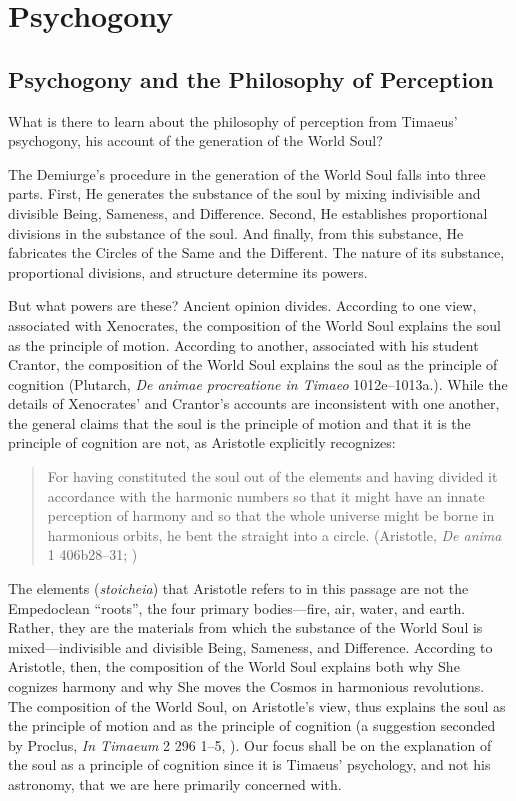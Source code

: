 
\chapter{Psychogony} %
\label{cha:psychogony}

\section{Psychogony and the Philosophy of Perception} %
\label{sec:psychogony_and_the_philosophy_of_perception}

What is there to learn about the philosophy of perception from Timaeus' psychogony, his account of the generation of the World Soul? 

The Demiurge's procedure in the generation of the World Soul falls into three parts. First, He generates the substance of the soul by mixing indivisible and divisible Being, Sameness, and Difference. Second, He establishes proportional divisions in the substance of the soul. And finally, from this substance, He fabricates the Circles of the Same and the Different. The nature of its substance, proportional divisions, and structure determine its powers. 

But what powers are these? Ancient opinion divides. According to one view, associated with Xenocrates, the composition of the World Soul explains the soul as the principle of motion. According to another, associated with his student Crantor, the composition of the World Soul explains the soul as the principle of cognition (Plutarch, \emph{De animae procreatione in Timaeo} 1012e--1013a.). While the details of Xenocrates' and Crantor's accounts are inconsistent with one another, the general claims that the soul is the principle of motion and that it is the principle of cognition are not, as Aristotle explicitly recognizes:
\begin{quote}
	For having constituted the soul out of the elements and having divided it accordance with the harmonic numbers so that it might have an innate perception of harmony and so that the whole universe might be borne in harmonious orbits, he bent the straight into a circle. (Aristotle, \emph{De anima} 1 406b28--31; \citealt[10]{Shields:2016ix})
\end{quote}
The elements (\emph{stoicheia}) that Aristotle refers to in this passage are not the Empedoclean ``roots'', the four primary bodies---fire, air, water, and earth. Rather, they are the materials from which the substance of the World Soul is mixed---indivisible and divisible Being, Sameness, and Difference. According to Aristotle, then, the composition of the World Soul explains both why She cognizes harmony and why She moves the Cosmos in harmonious revolutions. The composition of the World Soul, on Aristotle's view, thus explains the soul as the principle of motion and as the principle of cognition (a suggestion seconded by Proclus, \emph{In Timaeum} 2 296 1--5, \citealt{Diehl:1903re}). Our focus shall be on the explanation of the soul as a principle of cognition since it is Timaeus' psychology, and not his astronomy, that we are here primarily concerned with.

